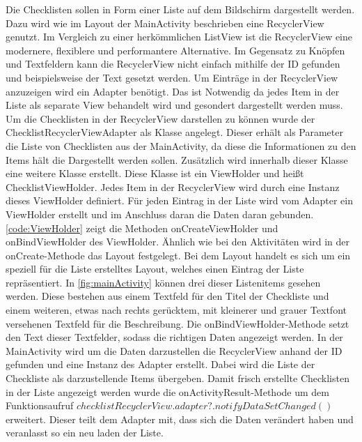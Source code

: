 Die Checklisten sollen in Form einer Liste auf dem Bildschirm dargestellt werden. Dazu wird wie im Layout der MainActivity beschrieben eine RecyclerView genutzt. Im Vergleich zu einer herkömmlichen ListView ist die RecyclerView eine modernere, flexiblere und performantere Alternative. Im Gegensatz zu Knöpfen und Textfeldern kann die RecyclerView nicht einfach mithilfe der ID gefunden und beispielsweise der Text gesetzt werden. Um Einträge in der RecyclerView anzuzeigen wird ein Adapter benötigt. Das ist Notwendig da jedes Item in der Liste als separate View behandelt wird und gesondert dargestellt werden muss. Um die Checklisten in der RecyclerView darstellen zu können wurde der ChecklistRecyclerViewAdapter als Klasse angelegt. Dieser erhält als Parameter die Liste von Checklisten aus der MainActivity, da diese die Informationen zu den Items hält die Dargestellt werden sollen. Zusätzlich wird innerhalb dieser Klasse eine weitere Klasse erstellt. Diese Klasse ist ein ViewHolder und heißt ChecklistViewHolder. Jedes Item in der RecyclerView wird durch eine Instanz dieses ViewHolder definiert. Für jeden Eintrag in der Liste wird vom Adapter ein ViewHolder erstellt und im Anschluss daran die Daten daran gebunden. \autoref{code:ViewHolder} zeigt die Methoden onCreateViewHolder und onBindViewHolder des ViewHolder. Ähnlich wie bei den Aktivitäten wird in der onCreate-Methode das Layout festgelegt. Bei dem Layout handelt es sich um ein speziell für die Liste erstelltes Layout, welches einen Eintrag der Liste repräsentiert. In \autoref{fig:mainActivity} können drei dieser Listenitems gesehen werden. Diese bestehen aus einem Textfeld für den Titel der Checkliste und einem weiteren, etwas nach rechts gerücktem, mit kleinerer und grauer Textfont versehenen Textfeld für die Beschreibung. Die onBindViewHolder-Methode setzt den Text dieser Textfelder, sodass die richtigen Daten angezeigt werden.
In der MainActivity wird um die Daten darzustellen die RecyclerView anhand der ID gefunden und eine Instanz des Adapter erstellt. Dabei wird die Liste der Checkliste als darzustellende Items übergeben. Damit frisch erstellte Checklisten in der Liste angezeigt werden wurde die onActivityResult-Methode um dem Funktionsaufruf 
$checklistRecyclerView.adapter?.notifyDataSetChanged()$ erweitert. Dieser teilt dem Adapter mit, dass sich die Daten verändert haben und veranlasst so ein neu laden der Liste.\\
\\


